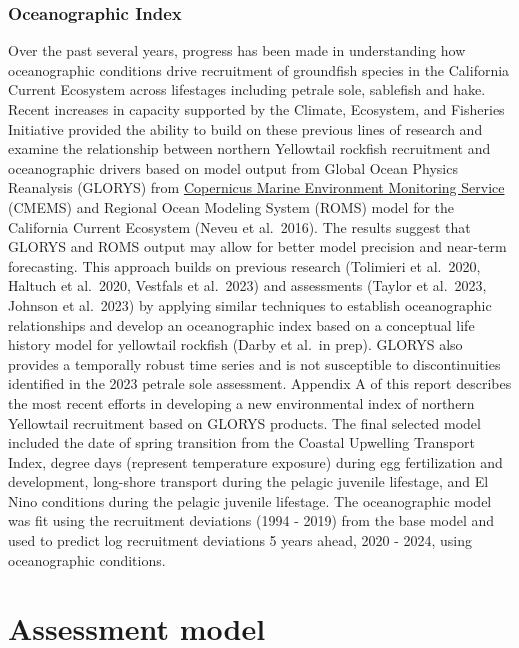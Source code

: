 \documentclass[
]{scrartcl}
\begin{document}
\subsubsection{Oceanographic Index}\label{oceanographic-index}

Over the past several years, progress has been made in understanding how
oceanographic conditions drive recruitment of groundfish species in the
California Current Ecosystem across lifestages including petrale sole,
sablefish and hake. Recent increases in capacity supported by the
Climate, Ecosystem, and Fisheries Initiative provided the ability to
build on these previous lines of research and examine the relationship
between northern Yellowtail rockfish recruitment and oceanographic
drivers based on model output from Global Ocean Physics Reanalysis
(GLORYS) from \href{https://marine.copernicus.eu/}{Copernicus Marine
Environment Monitoring Service} (CMEMS) and Regional Ocean Modeling
System (ROMS) model for the California Current Ecosystem (Neveu et
al.~2016). The results suggest that GLORYS and ROMS output may allow for
better model precision and near-term forecasting. This approach builds
on previous research (Tolimieri et al.~2020, Haltuch et al.~2020,
Vestfals et al.~2023) and assessments (Taylor et al.~2023, Johnson et
al.~2023) by applying similar techniques to establish oceanographic
relationships and develop an oceanographic index based on a conceptual
life history model for yellowtail rockfish (Darby et al.~in prep).
GLORYS also provides a temporally robust time series and is not
susceptible to discontinuities identified in the 2023 petrale sole
assessment. Appendix A of this report describes the most recent efforts
in developing a new environmental index of northern Yellowtail
recruitment based on GLORYS products. The final selected model included
the date of spring transition from the Coastal Upwelling Transport
Index, degree days (represent temperature exposure) during egg
fertilization and development, long-shore transport during the pelagic
juvenile lifestage, and El Nino conditions during the pelagic juvenile
lifestage. The oceanographic model was fit using the recruitment
deviations (1994 - 2019) from the base model and used to predict log
recruitment deviations 5 years ahead, 2020 - 2024, using oceanographic
conditions.

\newpage{}

\section{Assessment model}\label{assessment-model}
\end{document}
